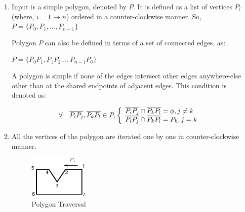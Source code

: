 \def\polygondecompositionstepsfigs{0.2}
\begin{enumerate}
[noitemsep,topsep=2pt,parsep=2pt,partopsep=2pt,leftmargin=*]

\item 
Input is a simple polygon, denoted by $P$. It is defined as a list of vertices $P_i$ (where, $i=1 \rightarrow n$) ordered in a counter-clockwise manner. So, 
$P = \{P_0,P_1,...,P_{n-1}\}$

Polygon $P$ can also be defined in terms of a set of connected edges, as:

$P = \{\overline{P_0 P_1},\overline{P_1 P_2}...,\overline{P_{n-1} P_0}\}$

A polygon is simple if none of the edges intersect other edges anywhere-else other than at the shared endpoints of adjacent edges. This condition is denoted as:

\begin{displaymath}
\forall \quad \overline{P_i P_j}, \overline{P_k P_l} \in P, \left\{ 
  \begin{array}{l l}
     \overline{P_i P_j} \cap \overline{P_k P_l} = \phi , j \neq k\\
     \overline{P_i P_j} \cap \overline{P_k P_l} = P_k  , j = k
  \end{array} \right.
\end{displaymath}

\item All the vertices of the polygon are iterated one by one in counter-clockwise manner. %


\begin{figure}[h]
\centering \includegraphics[width=0.33\linewidth]{images/polydecomp_traverse_1.pdf} 
\caption{Polygon Traversal}
\label{fig_traverse}
\end{figure}



\end{enumerate}
